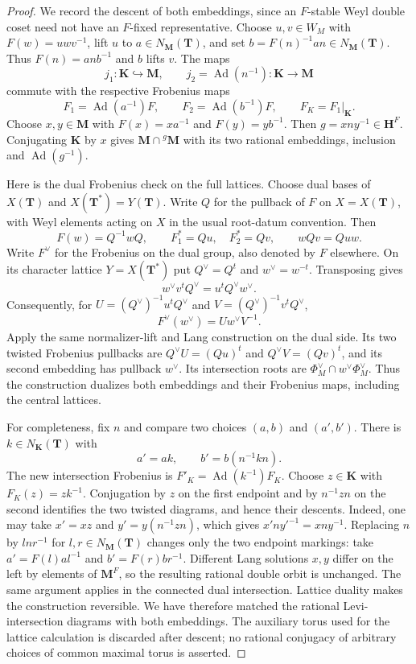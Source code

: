\begin{proof}
We record the descent of both embeddings, since an $F$-stable
Weyl double coset need not have an $F$-fixed representative.
Choose $u,v\in W_M$ with $F(w)=uwv^{-1}$, lift $u$ to
$a\in N_{\mathbf M}(\mathbf T)$, and set
$b=F(n)^{-1}an\in N_{\mathbf M}(\mathbf T)$.
Thus $F(n)=anb^{-1}$ and $b$ lifts $v$.  The maps
\[
 j_1:\mathbf K\hookrightarrow\mathbf M,\qquad
 j_2=\operatorname{Ad}(n^{-1}):\mathbf K\longrightarrow\mathbf M
\]
commute with the respective Frobenius maps
\[
 F_1=\operatorname{Ad}(a^{-1})F,\qquad
 F_2=\operatorname{Ad}(b^{-1})F,\qquad F_K=F_1|_{\mathbf K}.
\]
Choose $x,y\in\mathbf M$ with $F(x)=xa^{-1}$ and
$F(y)=yb^{-1}$.  Then $g=xny^{-1}\in\mathbf H^F$.
Conjugating $\mathbf K$ by $x$ gives
$\mathbf M\cap{}^g\mathbf M$ with its two rational embeddings,
inclusion and $\operatorname{Ad}(g^{-1})$.

Here is the dual Frobenius check on the full lattices.
Choose dual bases of $X(\mathbf T)$ and
$X(\mathbf T^*)=Y(\mathbf T)$.
Write $Q$ for the pullback of $F$ on $X=X(\mathbf T)$, with
Weyl elements acting on $X$ in the usual root-datum convention.  Then
\[
 F(w)=Q^{-1}wQ,\qquad F_1^*=Qu,\quad F_2^*=Qv,
 \qquad wQv=Quw.
\]
Write $F^\vee$ for the Frobenius on the dual group, also
denoted by $F$ elsewhere.  On its character lattice
$Y=X(\mathbf T^*)$ put
$Q^\vee=Q^t$ and $w^\vee=w^{-t}$.  Transposing gives
\[
 w^\vee v^tQ^\vee=u^tQ^\vee w^\vee.
\]
Consequently, for
$U=(Q^\vee)^{-1}u^tQ^\vee$ and
$V=(Q^\vee)^{-1}v^tQ^\vee$,
\[
 F^\vee(w^\vee)=Uw^\vee V^{-1}.
\]
Apply the same normalizer-lift and Lang construction on the dual
side.  Its two twisted Frobenius pullbacks are
$Q^\vee U=(Qu)^t$ and $Q^\vee V=(Qv)^t$, and its second
embedding has pullback $w^\vee$.  Its intersection roots are
$\Phi_M^\vee\cap w^\vee\Phi_M^\vee$.
Thus the construction dualizes both embeddings and their
Frobenius maps, including the central lattices.

For completeness, fix $n$ and compare two choices $(a,b)$ and
$(a',b')$.  There is $k\in N_{\mathbf K}(\mathbf T)$ with
\[
 a'=ak,\qquad b'=b(n^{-1}kn).
\]
The new intersection Frobenius is
$F'_K=\operatorname{Ad}(k^{-1})F_K$.  Choose
$z\in\mathbf K$ with $F_K(z)=zk^{-1}$.
Conjugation by $z$ on the first endpoint and by $n^{-1}zn$
on the second identifies the two twisted diagrams, and hence
their descents.  Indeed, one may take $x'=xz$ and
$y'=y(n^{-1}zn)$, which gives $x'ny'^{-1}=xny^{-1}$.
Replacing
$n$ by $lnr^{-1}$ for $l,r\in N_{\mathbf M}(\mathbf T)$
changes only the two endpoint markings: take
$a'=F(l)al^{-1}$ and $b'=F(r)br^{-1}$.
Different Lang solutions $x,y$ differ on the left by elements
of $\mathbf M^F$, so the resulting rational double orbit is
unchanged.  The same argument applies in the connected dual
intersection.  Lattice duality makes the construction reversible.
We have therefore matched the rational Levi-intersection diagrams
with both embeddings.  The auxiliary torus used for the lattice
calculation is discarded after descent; no rational conjugacy
of arbitrary choices of common maximal torus is asserted.


\end{proof}
